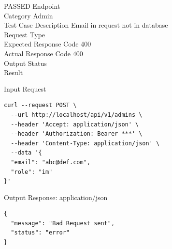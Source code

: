 \begin{testcase}{29}{PASSED}
Endpoint \hfill {}\\
Category \hfill Admin\\
Test Case Description \hfill Email in request not in database\\

Request Type    \hfill {}\\
Expected Response Code    \hfill 400\\
Actual Response Code    \hfill 400\\

Output Status \hfill {}\\
Result \hfill {}

\begin{ipblock}{Input Request}
\begin{verbatim}
curl --request POST \
  --url http://localhost/api/v1/admins \
  --header 'Accept: application/json' \
  --header 'Authorization: Bearer ***' \
  --header 'Content-Type: application/json' \
  --data '{
  "email": "abc@def.com",
  "role": "im"
}'
\end{verbatim}
\end{ipblock}

\begin{opblock}{Output Response: application/json}
\begin{verbatim}
{
  "message": "Bad Request sent",
  "status": "error"
}
\end{verbatim}
\end{opblock}
\end{testcase}

